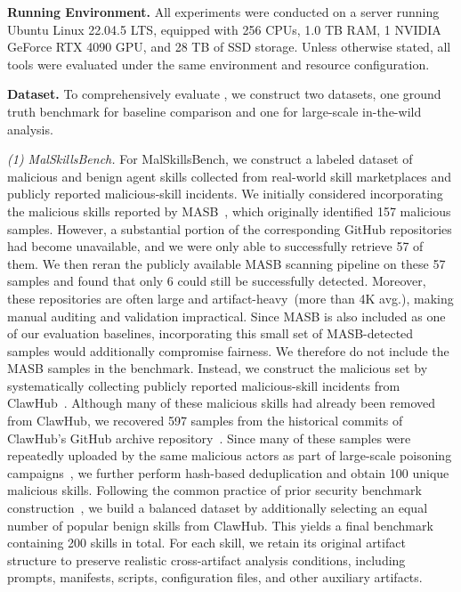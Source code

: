 \noindent \textbf{Running Environment.}
All experiments were conducted on a server running Ubuntu Linux 22.04.5 LTS, equipped with 256 CPUs, 1.0 TB RAM, 1 NVIDIA GeForce RTX 4090 GPU, and 28 TB of SSD storage. Unless otherwise stated, all tools were evaluated under the same environment and resource configuration.

\noindent \textbf{Dataset.}
To comprehensively evaluate \toolname, we construct two datasets, one ground truth benchmark for baseline comparison and one for large-scale in-the-wild analysis.

\textit{(1) MalSkillsBench.} 
For MalSkillsBench, we construct a labeled dataset of malicious and benign agent skills collected from real-world skill marketplaces and publicly reported malicious-skill incidents. We initially considered incorporating the malicious skills reported by MASB~\cite{liu2026maliciousagentskillswild}, which originally identified 157 malicious samples. However, a substantial portion of the corresponding GitHub repositories had become unavailable, and we were only able to successfully retrieve 57 of them. We then reran the publicly available MASB scanning pipeline on these 57 samples and found that only 6 could still be successfully detected. Moreover, these repositories are often large and artifact-heavy~(more than 4K avg.), making manual auditing and validation impractical. Since MASB is also included as one of our evaluation baselines, incorporating this small set of MASB-detected samples would additionally compromise fairness. We therefore do not include the MASB samples in the benchmark.
Instead, we construct the malicious set by systematically collecting publicly reported malicious-skill incidents from ClawHub~\cite{koi2026clawhavoc,snyk2026skills,philskents-clawhub-blocklist,opensourcemalware-clawdbot-crypto,piedpiper-openclaw-malicious-skills}. Although many of these malicious skills had already been removed from ClawHub, we recovered 597 samples from the historical commits of ClawHub's GitHub archive repository~\cite{openclaw-skills-archive}. Since many of these samples were repeatedly uploaded by the same malicious actors as part of large-scale poisoning campaigns~\cite{koi2026clawhavoc,opensourcemalware-clawdbot-crypto}, we further perform hash-based deduplication and obtain 100 unique malicious skills. Following the common practice of prior security benchmark construction~\cite{zahan2024malwarebench,cccs-cic-andmal2020,hyrum2018ember}, we build a balanced dataset by additionally selecting an equal number of popular benign skills from ClawHub. This yields a final benchmark containing 200 skills in total. For each skill, we retain its original artifact structure to preserve realistic cross-artifact analysis conditions, including prompts, manifests, scripts, configuration files, and other auxiliary artifacts.

